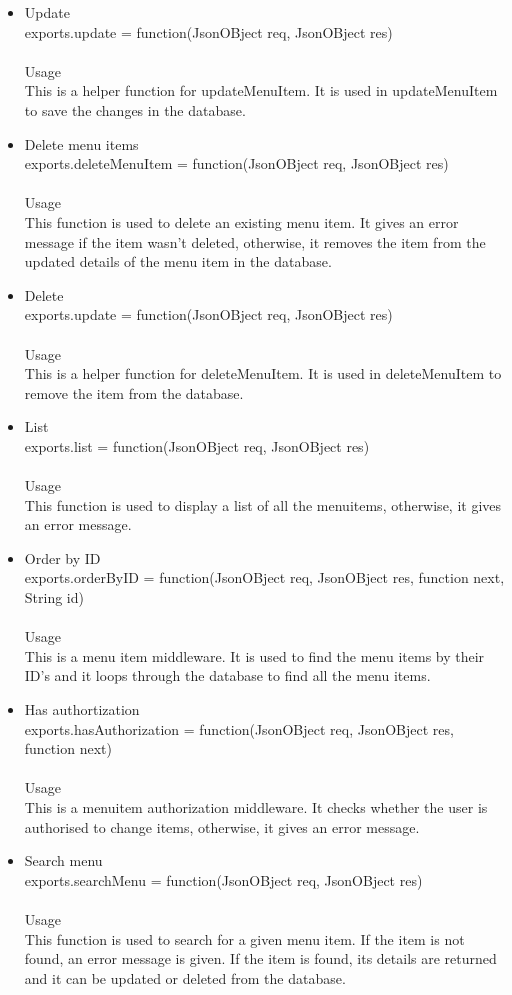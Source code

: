 \documentclass[a4paper,12pt]{article}
\begin{document}
\begin{enumerate}
\begin{itemize}
	\item Update\\ exports.update = function(JsonOBject req, JsonOBject res)\\ \\
 	 Usage\\ 
  	This is a helper function for updateMenuItem. It is used in updateMenuItem to save the changes in the database.
	\item Delete menu items\\ exports.deleteMenuItem = function(JsonOBject req, JsonOBject res)\\ \\
 	 Usage\\ 
  	This function is used to delete an existing menu item. It gives an error message if the item wasn't deleted, otherwise, it removes the item from the updated details of the menu item in the database.
	\item Delete \\ exports.update = function(JsonOBject req, JsonOBject res)\\ \\
 	 Usage\\ 
  	This is a helper function for deleteMenuItem. It is used in deleteMenuItem to remove the item from the database.
	\item List \\ exports.list = function(JsonOBject req, JsonOBject res)\\ \\
 	 Usage\\ 
  	This function is used to display a list of all the menuitems, otherwise, it gives an error message.
	\item Order by ID\\ exports.orderByID = function(JsonOBject req, JsonOBject res, function next, String id)\\ \\
 	 Usage\\ 
  	This is a menu item middleware. It is used to find the menu items by their ID's and it loops through the database to find all the menu items.
	\item Has authortization\\ exports.hasAuthorization = function(JsonOBject req, JsonOBject res, function next)\\ \\
 	 Usage\\ 
  	This is a menuitem authorization middleware. It checks whether the user is authorised to change items, otherwise, it gives an error message.
	\item Search menu \\ exports.searchMenu = function(JsonOBject req, JsonOBject res)\\ \\
 	 Usage\\ 
  	This function is used to search for a given menu item. If the item is not found, an error message is given. If the item is found, its details are returned and it can be updated or deleted from the database.
	\end{itemize}
\end{enumerate}
\end{document}

